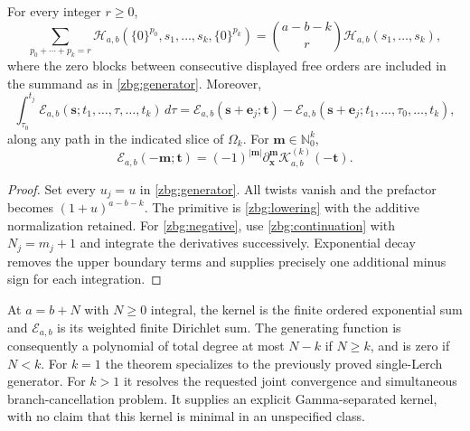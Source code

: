 \begin{corollary}\label{zbg:corollaries}
For every integer $r\geq0$,
\begin{equation}\label{zbg:insertion}
 \sum_{p_0+\cdots+p_k=r}
 \mathcal H_{a,b}(\{0\}^{p_0},s_1,\ldots,s_k,\{0\}^{p_k})
 =\binom{a-b-k}{r}\mathcal H_{a,b}(s_1,\ldots,s_k),
\end{equation}
where the zero blocks between consecutive displayed free orders are
included in the summand as in \eqref{zbg:generator}.  Moreover,
\begin{equation}\label{zbg:primitive}
 \int_{\tau_0}^{t_j}\mathscr E_{a,b}(\boldsymbol s;
                      t_1,\ldots,\tau,\ldots,t_k)\,d\tau
 =\mathscr E_{a,b}(\boldsymbol s+\boldsymbol e_j;\boldsymbol t)
  -\mathscr E_{a,b}(\boldsymbol s+\boldsymbol e_j;
                     t_1,\ldots,\tau_0,\ldots,t_k),
\end{equation}
along any path in the indicated slice of $\Omega_k$.
For $\boldsymbol m\in\mathbb N_0^k$,
\begin{equation}\label{zbg:negative}
 \mathscr E_{a,b}(-\boldsymbol m;\boldsymbol t)
 =(-1)^{|\boldsymbol m|}
       \partial_{\boldsymbol x}^{\boldsymbol m}
            \mathscr K_{a,b}^{(k)}(-\boldsymbol t).
\end{equation}
\end{corollary}

\begin{proof}
Set every $u_j=u$ in \eqref{zbg:generator}.  All twists vanish and
the prefactor becomes $(1+u)^{a-b-k}$.  The primitive is
\eqref{zbg:lowering} with the additive normalization retained.
For \eqref{zbg:negative}, use \eqref{zbg:continuation} with
$N_j=m_j+1$ and integrate the derivatives successively.  Exponential
decay removes the upper boundary terms and supplies precisely one
additional minus sign for each integration.
\end{proof}

At $a=b+N$ with $N\geq0$ integral, the kernel is the finite ordered
exponential sum and $\mathscr E_{a,b}$ is its weighted finite
Dirichlet sum.  The generating function is consequently a polynomial
of total degree at most $N-k$ if $N\geq k$, and is zero if $N<k$.
For $k=1$ the theorem specializes to the previously proved
single-Lerch generator.  For $k>1$ it resolves the requested joint
convergence and simultaneous branch-cancellation problem.  It supplies
an explicit Gamma-separated kernel, with no claim that this kernel is
minimal in an unspecified class.
